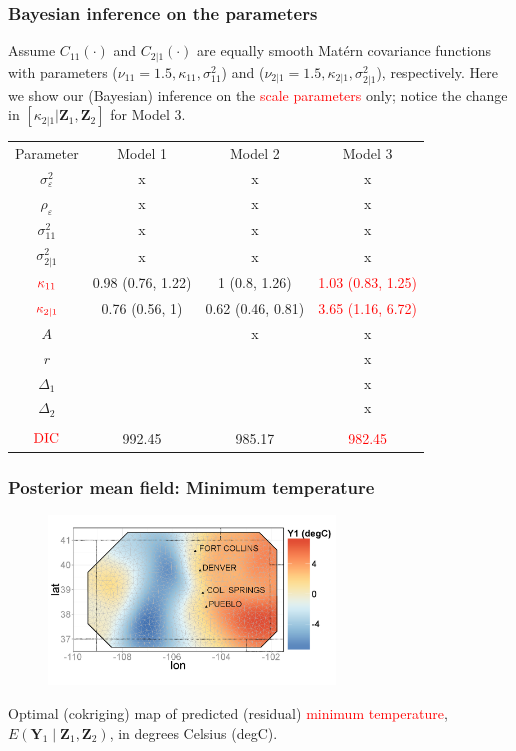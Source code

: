 \documentclass{beamer}
\newcommand{\Yvec}{\mathbf{Y}}
\newcommand{\Zvec}{\mathbf{Z}}
\newcommand{\E}{E}
\begin{document}

\begin{frame}
\frametitle{Bayesian inference on the parameters}
\vspace{-.5cm}
Assume $C_{11}(\cdot)$ and $C_{2|1}(\cdot)$ are equally smooth Mat{\'e}rn covariance functions with parameters ($\nu_{11}=1.5, \kappa_{11}, \sigma_{11}^2$) and ($\nu_{2|1}=1.5,\kappa_{2|1},\sigma_{2|1}^2$), respectively. Here we show our (Bayesian) inference on the \textcolor{red}{scale parameters} only; notice the change in $[\kappa_{2|1}|\mathbf{Z}_1,\mathbf{Z}_2]$ for Model 3.
\small
\begin{center}
\begin{tabular} {cccc}
  { Parameter} 	& {Model 1} 	& {Model 2} & {Model 3} 			 \\
  $\sigma_\varepsilon^2$&  x & x & x \\
  $\rho_\varepsilon$&  x & x & x \\
  $\sigma^2_{11}$& x & x & x \\
  $\sigma^2_{2|1}$& x & x & x \\
  $\textcolor{red}{\kappa_{11}}$&0.98 (0.76, 1.22)&1 (0.8, 1.26)&\textcolor{red}{1.03 (0.83, 1.25)}\\
  $\textcolor{red}{\kappa_{2|1}}$&0.76 (0.56, 1)&0.62 (0.46, 0.81)&\textcolor{red}{3.65 (1.16, 6.72)}\\
  $A$&& x & x \\
  $r$&&& x \\
  $\Delta_1$&&& x\\
  $\Delta_2$&&& x \\
  &&&\\
  $\textcolor{red}{\text{DIC}}$&992.45&985.17&\textcolor{red}{982.45}
\end{tabular}
\end{center}
\normalsize
\end{frame}


\begin{frame}
\frametitle{Posterior mean field: Minimum temperature}

\begin{figure}
\includegraphics[width=3in]{Fig3a1.png}
\end{figure}
\vspace{-.5cm}
Optimal (cokriging) map of predicted (residual) \textcolor{red}{minimum temperature}, $\E(\Yvec_1 \mid  \Zvec_1,\Zvec_2)$, in degrees Celsius (degC).
\end{frame}
\end{document}
